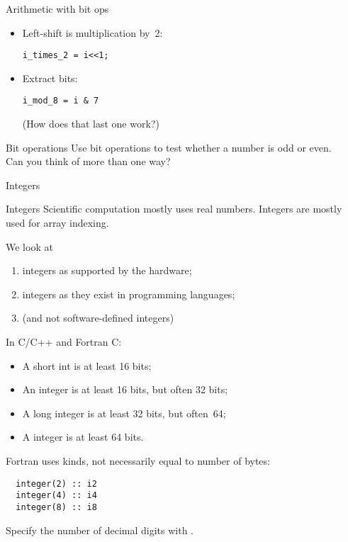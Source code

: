 \begin{numberedframe}{Arithmetic with bit ops}
  \begin{itemize}
  \item Left-shift is multiplication by~2:\\
\begin{lstlisting}
i_times_2 = i<<1;
\end{lstlisting}
\item Extract bits:
\begin{lstlisting}
i_mod_8 = i & 7
\end{lstlisting}
(How does that last one work?)
  \end{itemize}

\end{numberedframe}

\begin{exercise}{Bit operations}
  \label{ex:bit-even}
  Use bit operations to test whether a number is odd or even.\\
  Can you think of more than one way?
\end{exercise}

 {Integers}

\begin{numberedframe}{Integers}
Scientific computation mostly uses real numbers. Integers
are mostly used for array indexing.

We look at
\begin{enumerate}
\item integers as supported by the hardware;
\item integers as they exist in programming languages;
\item (and not software-defined integers)
\end{enumerate}
\end{numberedframe}

\begin{numberedframe}{In C/C++ and Fortran}
  C:
\begin{itemize}
\item A short int is at least 16 bits;
\item An integer is at least 16 bits, but often 32 bits;
\item A long integer is at least 32 bits, but often~64;
\item A  integer is at least 64 bits.
\end{itemize}

Fortran uses kinds, not necessarily equal to number of bytes:
\lstset{language=Fortran}
\begin{lstlisting}
  integer(2) :: i2
  integer(4) :: i4
  integer(8) :: i8  
\end{lstlisting}
Specify the number of decimal digits with .
\lstset{language=C}

\end{numberedframe}

